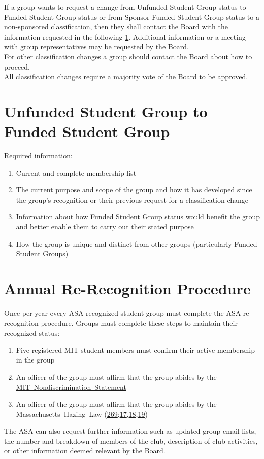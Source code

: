 \documentclass[12pt]{article}
\newcommand{\MHL}{%
    Massachusetts~Hazing~Law (\href{https://malegislature.gov/Laws/GeneralLaws/PartIV/TitleI/Chapter269}{269}:\href{https://malegislature.gov/Laws/GeneralLaws/PartIV/TitleI/Chapter269/Section17}{17},\href{https://malegislature.gov/Laws/GeneralLaws/PartIV/TitleI/Chapter269/Section18}{18},\href{https://malegislature.gov/Laws/GeneralLaws/PartIV/TitleI/Chapter269/Section19}{19})\xspace
}
\newcommand{\NDS}{\href{https://handbook.mit.edu/nondiscrimination}{MIT~Nondiscrimination~Statement}\xspace}
\begin{document}
If a group wants to request a change from Unfunded Student Group status to Funded Student Group
    status or from Sponsor-Funded Student Group status to a non-sponsored classification, then they shall
    contact the Board with the information requested in the following \ref{app:B_artVI_sect1}.
Additional information or a meeting with group representatives may be requested by the Board.
\\

For other classification changes a group should contact the Board about how to proceed.
\\

All classification changes require a majority vote of the Board to be approved.


\section{Unfunded Student Group to Funded Student Group}
\label{app:B_artVI_sect1}
Required information:
\begin{enumerate}
    \item Current and complete membership list
    \item The current purpose and scope of the group and how it has developed since the group's
        recognition or their previous request for a classification change
    \item Information about how Funded Student Group status would benefit the group and better
        enable them to carry out their stated purpose
    \item How the group is unique and distinct from other groups (particularly Funded Student Groups)
\end{enumerate}



\section{Annual Re-Recognition Procedure}
Once per year every ASA-recognized student group must complete the ASA re-recognition procedure.
Groups must complete these steps to maintain their recognized status:
\begin{enumerate}
    \item Five registered MIT student members must confirm their active membership in the group
    \item An officer of the group must affirm that the group abides by the \NDS
    \item An officer of the group must affirm that the group abides by the \MHL
\end{enumerate}
The ASA can also request further information such as updated group email lists, the number and
    breakdown of members of the club, description of club activities, or other information
    deemed relevant by the Board.
\\
\end{document}
